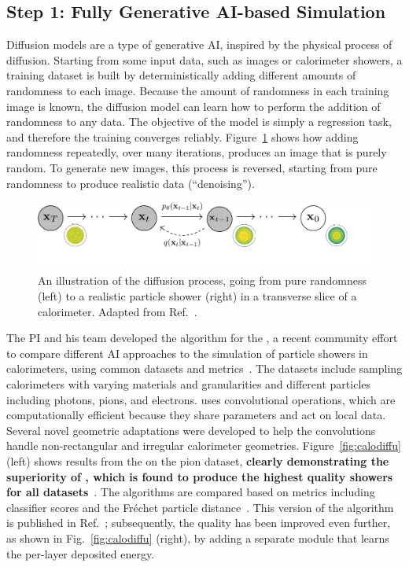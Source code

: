 \subsection{Step 1: Fully Generative AI-based Simulation}\label{subsec:diffu}

Diffusion models are a type of generative AI, inspired by the physical process of diffusion.
Starting from some input data, such as images or calorimeter showers,
a training dataset is built by deterministically adding different amounts of randomness to each image.
Because the amount of randomness in each training image is known, the diffusion model can learn how to perform the addition of randomness to any data.
The objective of the model is simply a regression task, and therefore the training converges reliably.
Figure~\ref{fig:illus} shows how adding randomness repeatedly, over many iterations, produces an image that is purely random.
To generate new images, this process is reversed, starting from pure randomness to produce realistic data (``denoising'').

\begin{figure}[htb!]
\centering
\includegraphics[width=0.95\myfigurewidth]{figures/pgm_diagram_xarrow_showers.pdf}
\caption{An illustration of the diffusion process, going from pure randomness (left) to a realistic particle shower (right) in a transverse slice of a calorimeter. Adapted from Ref.~\cite{Ho:2020}.}
\label{fig:illus}
\end{figure}

The PI and his team developed the \diffu algorithm for the \challenge,
a recent community effort to compare different AI approaches to the simulation of particle showers in calorimeters, using common datasets and metrics~\cite{CaloChallenge}.
The datasets include sampling calorimeters with varying materials and granularities and different particles including photons, pions, and electrons.
\diffu uses convolutional operations, which are computationally efficient because they share parameters and act on local data.
Several novel geometric adaptations were developed to help the convolutions handle non-rectangular and irregular calorimeter geometries.
Figure~\ref{fig:calodiffu} (left) shows results from the \challenge on the pion dataset, \textbf{clearly demonstrating the superiority of \diffu,
which is found to produce the highest quality showers for all datasets}~\cite{Krause:2023mlj}.
The algorithms are compared based on metrics including classifier scores and the Fr\'echet particle distance~\cite{Kansal:2022spb}.
This version of the algorithm is published in Ref.~\cite{Amram:2023onf};
subsequently, the quality has been improved even further, as shown in Fig.~\ref{fig:calodiffu} (right), by adding a separate module that learns the per-layer deposited energy.

